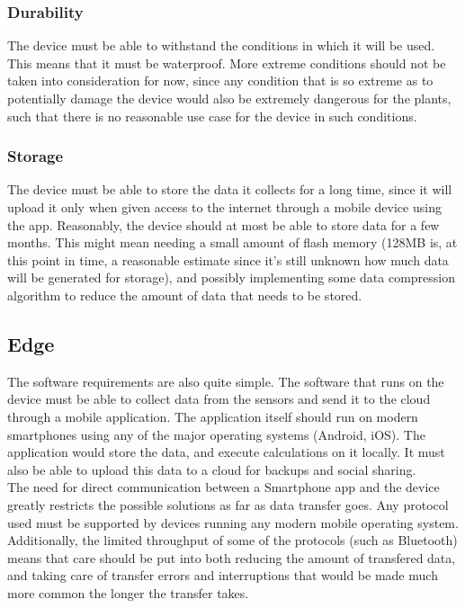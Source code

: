 \subsubsection{Durability}
The device must be able to withstand the conditions in which it will be used. This
means that it must be waterproof. More extreme conditions should not be taken into
consideration for now, since any condition that is so extreme as to potentially
damage the device would also be extremely dangerous for the plants, such that there
is no reasonable use case for the device in such conditions.

\subsubsection{Storage}
The device must be able to store the data it collects for a long time, since it will
upload it only when given access to the internet through a mobile device using the
app. Reasonably, the device should at most be able to store data for a few months.
This might mean needing a small amount of flash memory (128MB is, at this point in time,
a reasonable estimate since it's still unknown how much data will be generated for
storage), and possibly implementing some data compression algorithm to reduce the
amount of data that needs to be stored.

\subsection{Edge}
The software requirements are also quite simple. The software that runs on the device
must be able to collect data from the sensors and send it to the cloud through a
mobile application. The application itself should run on modern smartphones using
any of the major operating systems (Android, iOS). The application would store the
data, and execute calculations on it locally. It must also be able to upload this
data to a cloud for backups and social sharing.\\
The need for direct communication between a Smartphone app and the device greatly
restricts the possible solutions as far as data transfer goes. Any protocol used
must be supported by devices running any modern mobile operating system. Additionally,
the limited throughput of some of the protocols (such as Bluetooth) means that care
should be put into both reducing the amount of transfered data, and taking care of
transfer errors and interruptions that would be made much more common the longer
the transfer takes.

